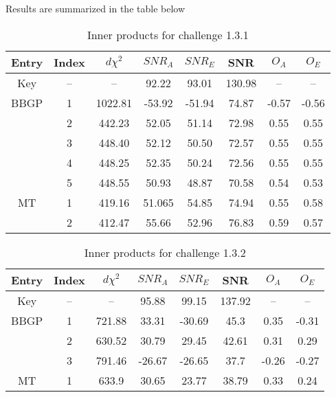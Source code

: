 \documentclass[prd,aps,amsfonts,amsmath, nofootinbib]{revtex4}
\begin{document}
Results are summarized in the table below
\begin{table}
\caption{\label{OlapsTable1.3.1} Inner products for challenge 1.3.1}
\begin{ruledtabular}
\begin{tabular}{|c|c|c|c|c|c|c|c|}
Entry & Index & $d\chi^2$ & $SNR_A$ & $SNR_E$ & SNR & $O_A$ & $O_E$\\
\hline
Key  & -- & -- & 92.22 & 93.01 & 130.98  & -- & -- \\
\hline
BBGP & 1  &  1022.81 & -53.92 & -51.94 & 74.87 & -0.57 & -0.56 \\
     & 2  &  442.23  &  52.05 & 51.14  & 72.98 & 0.55 & 0.55 \\
     & 3  &  448.40  &  52.12 & 50.50  & 72.57 & 0.55 & 0.55 \\
     & 4  &  448.25  &  52.35 & 50.24  & 72.56 & 0.55 & 0.55 \\
     & 5  &  448.55  &  50.93 & 48.87  & 70.58 & 0.54 & 0.53 \\
\hline
MT   & 1  & 419.16 & 51.065 & 54.85 & 74.94 & 0.55 & 0.58 \\
     & 2  & 412.47 & 55.66  & 52.96 & 76.83 & 0.59 & 0.57 \\
\hline
\end{tabular}
\end{ruledtabular}
\end{table}

\begin{table}
\caption{\label{OlapsTable1.3.2} Inner products for challenge 1.3.2}
\begin{ruledtabular}
\begin{tabular}{|c|c|c|c|c|c|c|c|}
Entry & Index & $d\chi^2$ & $SNR_A$ & $SNR_E$ & SNR & $O_A$ & $O_E$\\
\hline
Key  & -- & -- & 95.88 & 99.15 & 137.92 & -- & -- \\
\hline
BBGP & 1  & 721.88 & 33.31 & -30.69 & 45.3 & 0.35 & -0.31 \\
     & 2  & 630.52  & 30.79  & 29.45 & 42.61 &  0.31 & 0.29 \\
     & 3  & 791.46  & -26.67 & -26.65 & 37.7 & -0.26 & -0.27 \\
\hline
MT   & 1  & 633.9 & 30.65  & 23.77 & 38.79 & 0.33 & 0.24 \\
\hline
\end{tabular}
\end{ruledtabular}
\end{table}
\end{document}
